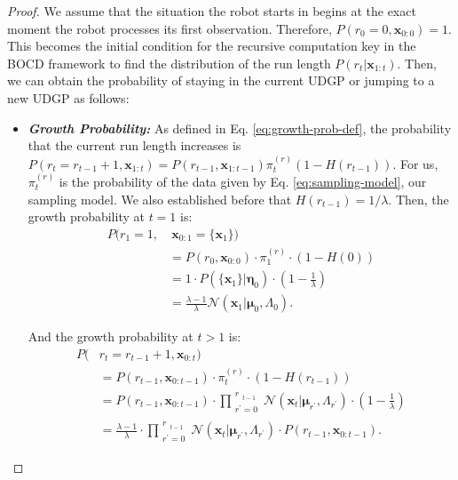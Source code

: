 \documentclass[Afour,sageh,times]{sagej}
\theoremstyle{lemma}
\begin{document}
\begin{proof} We assume that the situation the robot starts in begins at the exact moment the robot processes its first observation. Therefore, $P(r_0 = 0, \boldsymbol{x}_{0:0}) = 1$. This becomes the initial condition for the recursive computation key in the BOCD framework to find the distribution of the run length $P(r_t | \boldsymbol{x}_{1:t})$. Then, we can obtain the probability of staying in the current UDGP or jumping to a new UDGP as follows:

    \begin{itemize}[leftmargin=0.45cm]
        \item \textit{\textbf{Growth Probability:}} As defined in Eq. \eqref{eq:growth-prob-def}, the probability that the current run length increases is $P(r_t = r_{t-1}+1, \boldsymbol{x}_{1:t}) = P(r_{t-1}, \boldsymbol{x}_{1:t-1}) \pi_t^{(r)} (1 - H(r_{t-1}))$. For us, $\pi_t^{(r)}$ is the probability of the data given by Eq. \eqref{eq:sampling-model}, our sampling model. We also established before that $H(r_{t-1}) = 1 / \lambda$. Then, the growth probability at $t=1$ is:
        \begin{align*}
            P(r_1 = 1,&~\boldsymbol{x}_{0:1} = \{\boldsymbol{x}_1\}) \\&= P(r_0, \boldsymbol{x}_{0:0}) \cdot \pi_1^{(r)} \cdot (1 - H(0)) \nonumber \\
            &= 1 \cdot P(\{\boldsymbol{x}_1\} | \boldsymbol{\eta}_0) \cdot (1 - \frac{1}{\lambda}) \nonumber \\
            &= \frac{\lambda - 1}{\lambda} \mathcal{N}(\boldsymbol{x}_1 | \boldsymbol{\mu}_0, \Lambda_0). \nonumber
        \end{align*}

        And the growth probability at $t > 1$ is:
        \begin{align*}
            P(&r_t=r_{t-1}+1, \boldsymbol{x}_{0:t}) \\&= P(r_{t-1}, \boldsymbol{x}_{0:t-1}) \cdot \pi_t^{(r)} \cdot (1 - H(r_{t-1})) \nonumber \\
            &= P(r_{t-1}, \boldsymbol{x}_{0:t-1}) \cdot \prod_{\substack{r^\prime = 0}}^{\substack{r}_{t-1}} \mathcal{N} (\boldsymbol{x}_t | \boldsymbol{\mu}_{r^\prime}, \Lambda_{r^\prime}) \cdot (1 - \frac{1}{\lambda}) \nonumber \\
            &= \frac{\lambda - 1}{\lambda} \cdot \prod_{\substack{r^\prime = 0}}^{\substack{r}_{t-1}} \mathcal{N} (\boldsymbol{x}_t | \boldsymbol{\mu}_{r^\prime}, \Lambda_{r^\prime}) \cdot P(r_{t-1}, \boldsymbol{x}_{0:t-1}). \nonumber
        \end{align*}


\end{itemize}
\end{proof}
\end{document}
